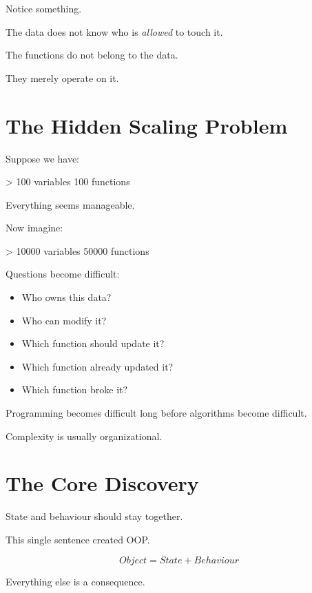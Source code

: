 \documentclass[11pt,a4paper]{book}
\begin{document}
\begin{idea}
Notice something.

The data \textcolor{RosettaOrange}{does not} know who is \emph{allowed} to touch it.

The functions do not belong to the data.

They merely operate on it.
\end{idea}


\section{The Hidden Scaling Problem}

\begin{mentalmodel}

Suppose we have:

        > 100 variables
100 functions

Everything seems manageable.

Now imagine:

        > 10000 variables
50000 functions

Questions become difficult:
\begin{itemize}
\item [*]{Who owns this data?}
\item [*]{Who can modify it?}
\item [*]{Which function should update it?}
\item [*]{Which function already updated it?}
\item [*]{Which function broke it?}
\end{itemize}
\end{mentalmodel}

\begin{rosettarule}
Programming becomes difficult long before algorithms
become difficult.

Complexity is usually organizational.
\end{rosettarule}


\section{The Core Discovery}

\begin{idea}

State and behaviour should stay together.

This single sentence created OOP.\@

\[
Object = State + Behaviour
\]

Everything else is a consequence.
\end{idea}
\end{document}
